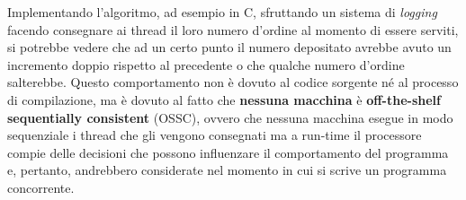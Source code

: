 Implementando l'algoritmo, ad esempio in C, sfruttando un sistema di \textit{logging} facendo consegnare ai thread il loro numero d'ordine al momento di essere serviti, si potrebbe vedere che ad un certo punto il numero depositato avrebbe avuto un incremento doppio rispetto al precedente o che qualche numero d'ordine salterebbe.
Questo comportamento non è dovuto al codice sorgente né al processo di compilazione, ma è dovuto al fatto che \textbf{nessuna macchina} è \textbf{off-the-shelf sequentially consistent} (OSSC), ovvero che nessuna macchina esegue in modo sequenziale i thread che gli vengono consegnati ma a run-time il processore compie delle decisioni che possono influenzare il comportamento del programma e, pertanto, andrebbero considerate nel momento in cui si scrive un programma concorrente.